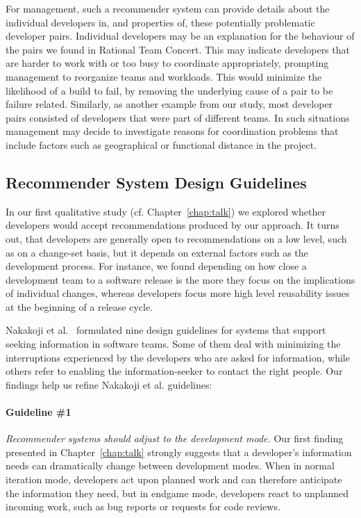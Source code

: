 For management, such a recommender system can provide details about the
individual developers in, and properties of, these potentially problematic
developer pairs. Individual developers may be an explanation for the behaviour of
the pairs we found in Rational Team Concert. This may indicate developers that are
harder to work with or too busy to coordinate appropriately, prompting management
to reorganize teams and workloads. This would minimize the likelihood of a build
to fail, by removing the underlying cause of a pair to be failure related.
Similarly, as another example from our study, most developer pairs
consisted of developers that were part of different teams. In such
situations management may decide to investigate reasons for coordination
problems that include factors such as geographical or functional distance in the project.

\subsection{Recommender System Design Guidelines}
\label{sec:sub:tools}
In our first qualitative study (cf. Chapter~\ref{chap:talk}) we explored whether developers would accept recommendations produced by our approach.
It turns out, that developers are generally open to recommendations on a low level, such as on a change-set basis, but it depends on external factors such as the development process.
For instance, we found depending on how close a development team to a software release is the more they focus on the implications of individual changes, whereas developers focus more high level reusability issues at the beginning of a release cycle.

Nakakoji et al.~\cite{nakakoji2010:rdc} formulated nine design guidelines for systems that support seeking information in software teams. Some of them deal with minimizing the interruptions experienced by the developers who are asked for information, while others refer to enabling the information-seeker to contact the right people. Our findings help us refine Nakakoji et al. guidelines:

\paragraph{Guideline \#1} \emph{Recommender systems should adjust to the development mode.}
Our first finding presented in Chapter~\ref{chap:talk} strongly suggests that a developer's information needs can dramatically change between development modes. 
%
When in normal iteration mode, developers act upon planned work and can therefore anticipate the information they need, but in endgame mode, developers react to unplanned incoming work, such as bug reports or requests for code reviews. 


